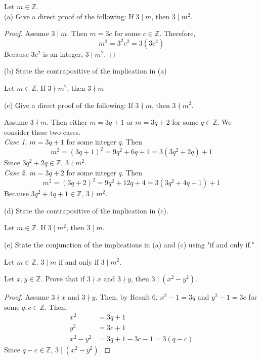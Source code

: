 \documentclass[12pt]{article}
\newcommand{\Z}{\mathbb{Z}}
\newenvironment{problem}[2][Problem]{\begin{trivlist}
		\item[\hskip \labelsep {\bfseries #1}\hskip \labelsep {\bfseries #2.}]}{\end{trivlist}}
\newenvironment{solution}[2][Solution]{\begin{trivlist}
		\item[\hskip \labelsep {\bfseries #1}\hskip \labelsep {\bfseries #2.}]}{\end{trivlist}}
\begin{document}
	\begin{problem}{3}
		Let $m\in \Z$.\\
		
		(a) Give a direct proof of the following: If $3 \mid m$, then $3\mid m^{2}$.
		\begin{proof}
			Assume $3 \mid m$. Then $m=3c$ for some $c\in \Z$. Therefore,
			\begin{equation*}
				m^{2} = 3^{2}c^{2} = 3(3c^{2})
			\end{equation*}
		Because $3c^{2}$ is an integer, $3\mid m^{2}$.
		\end{proof}
	
		(b) State the contrapositive of the implication in (a)
		\begin{solution}{b}
			Let $m\in \Z$. If $3\nmid m^{2}$, then $3\nmid m$
		\end{solution}
	
		(c) Give a direct proof of the following: If $3\nmid m$, then $3\nmid m^{2}$.
		\begin{solution}{c}
			Assume $3\nmid m$. Then either $m=3q+1$ or $m=3q+2$ for some $q\in \Z$. We consider these two cases.\\ \textit{Case 1.} $m=3q+1$ for some integer $q$. Then
			\begin{equation*}
				m^{2} = (3q+1)^{2} = 9q^{2} +6q+1= 3(3q^{2}+2q)+1
			\end{equation*}
			Since $3q^{2}+2q\in \Z$, $3\nmid m^{2}$.\\
			\textit{Case 2.} $m=3q+2$ for some integer $q$. Then
			\begin{equation*}
				m^{2} = (3q+2)^{2} = 9q^{2}+12q+4 = 3(3q^{2}+4q+1)+1
			\end{equation*}
		Because $3q^{2}+4q+1\in \Z$, $3\nmid m^{2}$.
		\end{solution}
	
		(d) State the contrapositive of the implication in (c).
		\begin{solution}{d}
			Let $m\in \Z$. If $3\mid m^{2}$, then $3\mid m$.
		\end{solution}
	
		(e) State the conjunction of the implications in (a) and (c) using "if and only if."
		\begin{solution}{e}
			Let $m\in \Z$. $3\mid m$ if and only if $3\mid m^{2}$.
		\end{solution}
	\end{problem}

	\begin{problem}{4}
		Let $x,y \in \Z$. Prove that if $3 \nmid x$ and $3 \nmid y$, then $3 \mid (x^{2}-y^{2})$.
		\begin{proof}
			Assume $3 \nmid x$ and $3 \nmid y$. Then, by Result 6, $x^{2}-1 = 3q$ and $y^{2}-1 = 3c$ for some $q,c \in \Z$. Then,
			\begin{align*}
				x^{2} &= 3q+1\\
				y^{2} &= 3c+1\\
				x^{2}-y^{2} &= 3q+1-3c-1=3(q-c)
			\end{align*}
			Since $q-c\in \Z$, $3 \mid (x^{2}-y^{2})$.
		\end{proof}
	\end{problem}
\end{document}
